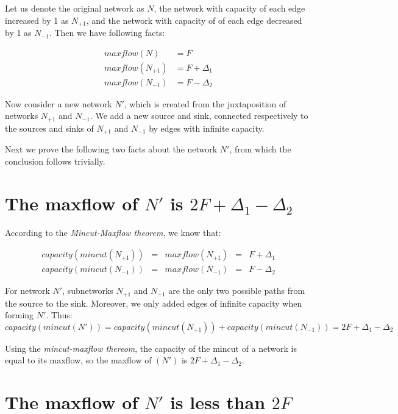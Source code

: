 
Let us denote the original network as $N$, the network with capacity of each edge increased by 1 as $N_{+1}$, and the network with capacity of of each edge decreased by 1 as $N_{-1}$. Then we have following facts:

\[
  \begin{array}{ll}
    maxflow(N)      & = F \\
    maxflow(N_{+1}) & = F + \Delta_1 \\
    maxflow(N_{-1}) & = F - \Delta_2
  \end{array}
\]

Now consider a new network $N\prime$, which is created from the juxtaposition of networks $N_{+1}$ and $N_{-1}$. We add a new source and sink, connected respectively to the sources and sinks of $N_{+1}$ and $N_{-1}$ by edges with infinite capacity.

Next we prove the following two facts about the network $N\prime$, from which the conclusion follows trivially.

\section{The maxflow of $N\prime$ is $2F + \Delta_1 - \Delta_2$}

According to the \textit{Mincut-Maxflow theorem}, we know that:

\[
  \begin{array}{lclcl}
    capacity(mincut(N_{+1})) & = & maxflow(N_{+1}) & = & F + \Delta_1 \\
    capacity(mincut(N_{-1})) & = & maxflow(N_{-1}) & = & F - \Delta_2
  \end{array}
\]

For network $N\prime$, subnetworks $N_{+1}$ and $N_{-1}$ are the only two possible paths from the source to the sink. Moreover, we only added edges of infinite capacity when forming $N\prime$. Thus:
\[
  capacity(mincut(N\prime)) = capacity(mincut(N_{+1})) + capacity(mincut(N_{-1})) = 2F + \Delta_1 - \Delta_2
\]

Using the \textit{mincut-maxflow thereom}, the capacity of the mincut of a network is equal to its maxflow, so the maxflow of $(N\prime)$ is $2F + \Delta_1 - \Delta_2$.

\section{The maxflow of $N\prime$ is less than $2F$}

